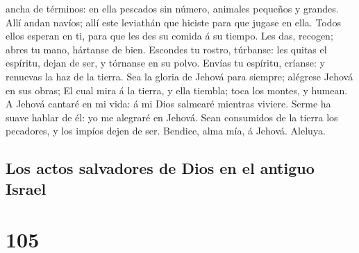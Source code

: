 ancha de términos: en ella pescados sin número, animales pequeños y
grandes.  Allí andan navíos; allí este leviathán que
hiciste para que jugase en ella.  Todos ellos esperan en
ti, para que les des su comida á su tiempo.  Les das,
recogen; abres tu mano, hártanse de bien.  Escondes tu
rostro, túrbanse: les quitas el espíritu, dejan de ser, y tórnanse en su
polvo.  Envías tu espíritu, críanse: y renuevas la haz de
la tierra.  Sea la gloria de Jehová para siempre;
alégrese Jehová en sus obras;  El cual mira á la tierra,
y ella tiembla; toca los montes, y humean.  A Jehová
cantaré en mi vida: á mi Dios salmearé mientras viviere. 
Serme ha suave hablar de él: yo me alegraré en Jehová. 
Sean consumidos de la tierra los pecadores, y los impíos dejen de ser.
Bendice, alma mía, á Jehová. Aleluya.

\hypertarget{los-actos-salvadores-de-dios-en-el-antiguo-israel}{%
\subsection{Los actos salvadores de Dios en el antiguo
Israel}\label{los-actos-salvadores-de-dios-en-el-antiguo-israel}}

\hypertarget{section-104}{%
\section{105}\label{section-104}}


